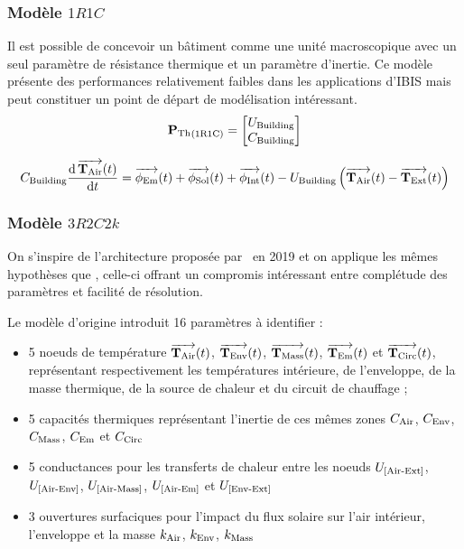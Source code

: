         \subsubsection{Modèle $1R1C$}
            Il est possible de concevoir un bâtiment comme une unité macroscopique avec un seul paramètre de résistance thermique et un paramètre d'inertie.
            Ce modèle présente des performances relativement faibles dans les applications d'IBIS mais peut constituer un point de départ de modélisation intéressant.
            \begin{equation}
                {\mathbf P_{\text{Th}}}_{(\text{1R1C})} = \begin{bmatrix}
               U_{\text{Building}} \\
               C_{\text{Building}}
            \end{bmatrix}
                \label{eq:Pth1R1C}
            \end{equation}

            \begin{equation}
                C_{\text{Building}}\frac{\mathrm{d}\operatorname{\overrightarrow{\mathbf{T}_{\text{Air}}}}(t)}{\mathrm dt} = \operatorname{\overrightarrow{\mathbf{\phi}_{\text{Em}}}}(t) + \operatorname{\overrightarrow{\phi_{\text{Sol}}}}(t) + \operatorname{\overrightarrow{\phi_{\text{Int}}}}(t) - U_{\text{Building}}\left(\operatorname{\overrightarrow{\mathbf{T}_{\text{Air}}}}(t) - \operatorname{\overrightarrow{\mathbf{T}_{\text{Ext}}}}(t)\right)\label{eq:oneronec}
            \end{equation}
        \subsubsection{Modèle $3R2C2k$}
            On s'inspire de l'architecture proposée par~\cite{aoun} en 2019 et on applique les mêmes hypothèses que \cite{TST}, celle-ci offrant un compromis intéressant entre complétude des paramètres et facilité de résolution.

            Le modèle d'origine introduit 16 paramètres à identifier :
            \begin{itemize}
                \item 5 noeuds de température $\operatorname{\overrightarrow{\mathbf{T}_{\text{Air}}}}(t)$, $\operatorname{\overrightarrow{\mathbf{T}_{\text{Env}}}}(t)$, $\operatorname{\overrightarrow{\mathbf{T}_{\text{Mass}}}}(t)$, $\operatorname{\overrightarrow{\mathbf{T}_{\text{Em}}}}(t)$ et $\operatorname{\overrightarrow{\mathbf{T}_{\text{Circ}}}}(t)$, représentant respectivement les températures intérieure, de l'\gls{enveloppe}, de la masse thermique, de la source de chaleur et du circuit de chauffage ;
                \item 5 capacités thermiques représentant l'inertie de ces mêmes zones $C_{\text{Air}}$, $C_{\text{Env}}$, $C_{\text{Mass}}$, $C_{\text{Em}}$ et $C_{\text{Circ}}$
                \item 5 conductances pour les transferts de chaleur entre les noeuds $U_{\left[\text{Air-Ext}\right]}$, $U_{\left[\text{Air-Env}\right]}$, $U_{\left[\text{Air-Mass}\right]}$, $U_{\left[\text{Air-Em}\right]}$ et $U_{\left[\text{Env-Ext}\right]}$
                \item 3 ouvertures surfaciques pour l'impact du flux solaire sur l'air intérieur, l'\gls{enveloppe} et la masse $k_{\text{Air}}$, $k_{\text{Env}}$, $k_{\text{Mass}}$
            \end{itemize}

